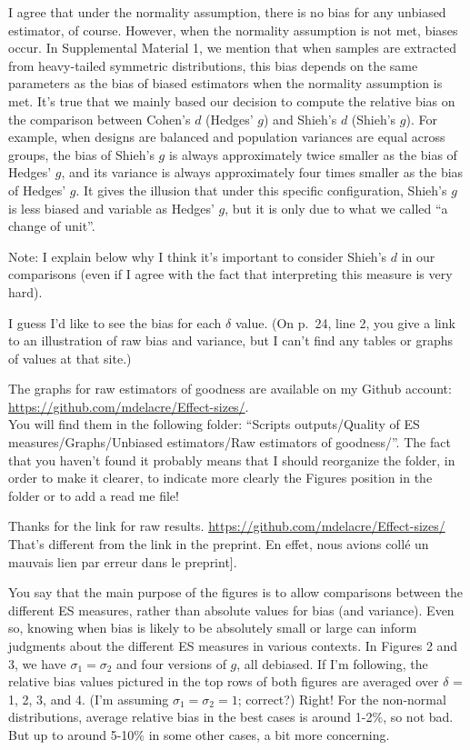 \documentclass[
  12pt,
  french,
]{article}
\begin{document}
\color{blue} I agree that under the normality assumption, there is no
bias for any unbiased estimator, of course. However, when the normality
assumption is not met, biases occur. In Supplemental Material 1, we
mention that when samples are extracted from heavy-tailed symmetric
distributions, this bias depends on the same parameters as the bias of
biased estimators when the normality assumption is met. It's true that
we mainly based our decision to compute the relative bias on the
comparison between Cohen's \(d\) (Hedges' \(g\)) and Shieh's \(d\)
(Shieh's \(g\)). For example, when designs are balanced and population
variances are equal across groups, the bias of Shieh's \(g\) is always
approximately twice smaller as the bias of Hedges' \(g\), and its
variance is always approximately four times smaller as the bias of
Hedges' \(g\). It gives the illusion that under this specific
configuration, Shieh's \(g\) is less biased and variable as Hedges'
\(g\), but it is only due to what we called ``a change of unit''.

Note: I explain below why I think it's important to consider Shieh's
\(d\) in our comparisons (even if I agree with the fact that
interpreting this measure is very hard).

\color{black} I guess I'd like to see the bias for each \(\delta\)
value. (On p.~24, line 2, you give a link to an illustration of raw bias
and variance, but I can't find any tables or graphs of values at that
site.)

\color{blue} The graphs for raw estimators of goodness are available on
my Github account:\\
\underline{https://github.com/mdelacre/Effect-sizes/}.\\
You will find them in the following folder: ``Scripts outputs/Quality of
ES measures/Graphs/Unbiased estimators/Raw estimators of goodness/''.
The fact that you haven't found it probably means that I should
reorganize the folder, in order to make it clearer, to indicate more
clearly the Figures position in the folder or to add a read me file!

\color{brown} Thanks for the link for raw results.
\url{https://github.com/mdelacre/Effect-sizes/} That's different from
the link in the preprint. \color{darkgray}{[}En effet, nous avions collé
un mauvais lien par erreur dans le preprint{]}.

\color{black} You say that the main purpose of the figures is to allow
comparisons between the different ES measures, rather than absolute
values for bias (and variance). Even so, knowing when bias is likely to
be absolutely small or large can inform judgments about the different ES
measures in various contexts. In Figures 2 and 3, we have
\(\sigma_1=\sigma_2\) and four versions of \(g\), all debiased. If I'm
following, the relative bias values pictured in the top rows of both
figures are averaged over \(\delta\) = 1, 2, 3, and 4. (I'm assuming
\(\sigma_1=\sigma_2=1\); correct?) \color{blue} Right! \color{black} For
the non-normal distributions, average relative bias in the best cases is
around 1-2\(\%\), so not bad. But up to around 5-10\(\%\) in some other
cases, a bit more concerning.
\end{document}
